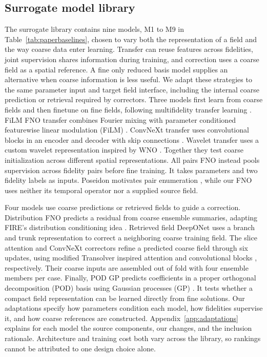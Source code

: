 \subsection{Surrogate model library}
The surrogate library contains nine models, M1 to M9 in Table~\ref{tab:paperbaselines},
chosen to vary both the representation of a field and the way coarse data
enter learning. Transfer can reuse features across fidelities, joint supervision
shares information during training, and correction uses a coarse field as a
spatial reference. A fine only reduced basis model supplies an alternative
when coarse information is less useful. We adapt these strategies to the same
parameter input and target field interface, including the internal coarse
prediction or retrieval required by correctors. Three models first learn from coarse fields
and then finetune on fine fields, following multifidelity transfer learning
\citep{lyu2023}. FiLM FNO transfer combines Fourier mixing
\citep{li2021fno} with parameter conditioned featurewise linear modulation
(FiLM) \citep{perez2018}.
ConvNeXt transfer uses convolutional blocks in an encoder and decoder with skip
connections \citep{liu2022convnext}. Wavelet transfer uses a custom wavelet
representation inspired by WNO \citep{tripura2022wno}. Together they test coarse
initialization across different spatial representations. All pairs FNO instead
pools supervision across fidelity pairs before fine training. It takes
parameters and two fidelity labels as inputs. Poseidon motivates pair enumeration
\citep{herde2024}, while our FNO \citep{li2021fno} uses neither its temporal
operator nor a supplied source field.

Four models use coarse predictions or retrieved fields to guide a correction.
Distribution FNO predicts a residual from coarse ensemble summaries, adapting
FIRE's distribution conditioning idea \citep{yu2026fire}. Retrieved field
DeepONet uses a branch and trunk representation \citep{lu2021,lu2022mf} to
correct a neighboring coarse training field. The slice attention and ConvNeXt
correctors refine a predicted coarse field through six updates, using modified
Transolver inspired attention \citep{wu2024transolver} and convolutional blocks
\citep{liu2022convnext}, respectively. Their coarse inputs are assembled out of
fold with four ensemble members per case. Finally, POD GP predicts coefficients
in a proper orthogonal decomposition (POD) basis using Gaussian processes (GP)
\citep{higdon2008}. It tests whether a compact field representation can be
learned directly from fine solutions. Our adaptations specify how parameters
condition each model, how fidelities supervise it, and how coarse references
are constructed. Appendix~\ref{app:adaptations} explains for each model
the source components, our changes, and the inclusion rationale. Architecture and training cost
both vary across the library, so rankings cannot be attributed to one design
choice alone.

